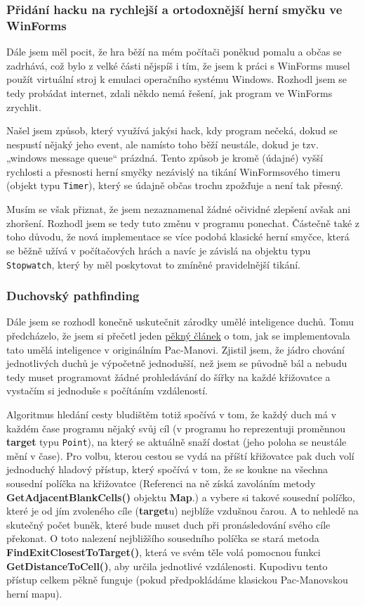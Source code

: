 \documentclass[a4]{article}
\begin{document}
\subsubsection{Přidání hacku na rychlejší a ortodoxnější herní smyčku ve WinForms} \label{gameloophack}
Dále jsem měl pocit, že hra běží na mém počítači poněkud pomalu a občas se zadrhává, což bylo z velké části nějspíš i tím, že jsem k práci s WinForms musel použít virtuální stroj k emulaci operačního systému Windows. Rozhodl jsem se tedy probádat internet, zdali někdo nemá řešení, jak program ve WinForms zrychlit. 

Našel jsem způsob, který využívá jakýsi hack, kdy program nečeká, dokud se nespustí nějaký jeho event, ale namísto toho běží neustále, dokud je tzv. „windows message queue“ prázdná. Tento způsob je kromě (údajné) vyšší rychlosti a přesnosti herní smyčky nezávislý na tikání WinFormsového timeru (objekt typu \verb|Timer|), který se údajně občas trochu zpožďuje a není tak přesný. 

Musím se však přiznat, že jsem nezaznamenal žádné očividné zlepšení avšak ani zhoršení. Rozhodl jsem se tedy tuto změnu v programu ponechat. Částečně také z toho důvodu, že nová implementace se více podobá klasické herní smyčce, která se běžně užívá v počítačových hrách a navíc je závislá na objektu typu \verb|Stopwatch|, který by měl poskytovat to zmíněné pravidelnější tikání.

\subsubsection{Duchovský pathfinding} \label{ghostpathfinding}
Dále jsem se rozhodl konečně uskutečnit zárodky umělé inteligence duchů. Tomu předcházelo, že jsem si přečetl jeden \href{https://www.gamedeveloper.com/design/the-pac-man-dossier}{pěkný článek} o tom, jak se implementovala tato umělá inteligence v originálním Pac-Manovi. Zjistil jsem, že jádro chování jednotlivých duchů je výpočetně jednodušší, než jsem se původně bál a nebudu tedy muset programovat žádné prohledávání do šířky na každé křižovatce a vystačím si jednoduše s počítáním vzdáleností. 

Algoritmus hledání cesty bludištěm totiž spočívá v tom, že každý duch má v každém čase programu nějaký svůj cíl (v programu ho reprezentuji proměnnou \textbf{target} typu \verb|Point|), na který se aktuálně snaží dostat (jeho poloha se neustále mění v čase). Pro volbu, kterou cestou se vydá na příští křižovatce pak duch volí jednoduchý hladový přístup, který spočívá v tom, že se koukne na všechna sousední políčka na křižovatce (Referenci na ně získá zavoláním metody \textbf{GetAdjacentBlankCells()} objektu \textbf{Map}.) a vybere si takové sousední políčko, které je od jím zvoleného cíle (\textbf{target}u) nejblíže vzdušnou čarou. A to nehledě na skutečný počet buněk, které bude muset duch při pronásledování svého cíle překonat. O toto nalezení nejbližšího sousedního políčka se stará metoda \textbf{FindExitClosestToTarget()}, která ve svém těle volá pomocnou funkci \textbf{GetDistanceToCell()}, aby určila jednotlivé vzdálenosti. Kupodivu tento přístup celkem pěkně funguje (pokud předpokládáme klasickou Pac-Manovskou herní mapu).
\end{document}
